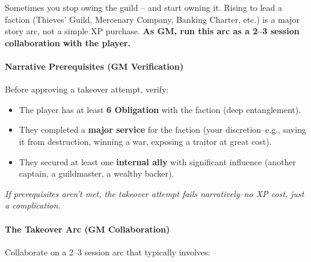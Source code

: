 \begin{tcolorbox}[colback=black!3!white,colframe=black!60!white,title=From Faction to Asset/Follower: Taking Over a Terrestrial Patron (GM Guidance),label=sec:takeover-sidebar,breakable]
Sometimes you stop owing the guild -- and start owning it. Rising to lead a faction (Thieves' Guild, Mercenary Company, Banking Charter, etc.) is a major story arc, not a simple XP purchase. \textbf{As GM, run this arc as a 2--3 session collaboration with the player.}  

\paragraph{Narrative Prerequisites (GM Verification)}
Before approving a takeover attempt, verify:  
\begin{itemize}
  \item The player has at least \textbf{6 Obligation} with the faction (deep entanglement).  
  \item They completed a \textbf{major service} for the faction (your discretion--e.g., saving it from destruction, winning a war, exposing a traitor at great cost).  
  \item They secured at least one \textbf{internal ally} with significant influence (another captain, a guildmaster, a wealthy backer).  
\end{itemize}
\textit{If prerequisites aren't met, the takeover attempt fails narratively--no XP cost, just a complication.}

\paragraph{The Takeover Arc (GM Collaboration)}
Collaborate on a 2--3 session arc that typically involves:  
\end{tcolorbox}
